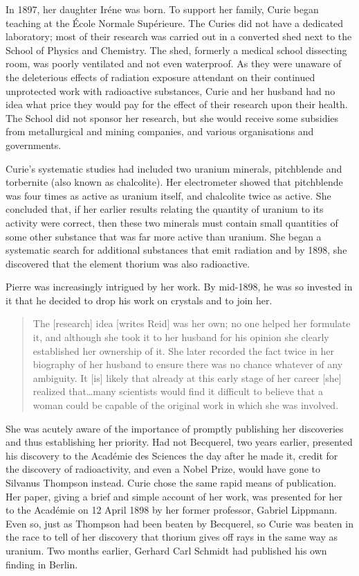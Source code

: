 \documentclass[12pt,a4paper]{article}
\begin{document}
In 1897, her daughter Ir\'ene was born. To support her family, Curie began teaching at the \'Ecole Normale Sup\'erieure. The Curies did not have a dedicated laboratory; most of their research was carried out in a converted shed next to the School of Physics and Chemistry. The shed, formerly a medical school dissecting room, was poorly ventilated and not even waterproof. As they were unaware of the deleterious effects of radiation exposure attendant on their continued unprotected work with radioactive substances, Curie and her husband had no idea what price they would pay for the effect of their research upon their health. The School did not sponsor her research, but she would receive some subsidies from metallurgical and mining companies, and various organisations and governments.

Curie's systematic studies had included two uranium minerals, pitchblende and torbernite (also known as chalcolite). Her electrometer showed that pitchblende was four times as active as uranium itself, and chalcolite twice as active. She concluded that, if her earlier results relating the quantity of uranium to its activity were correct, then these two minerals must contain small quantities of some other substance that was far more active than uranium. She began a systematic search for additional substances that emit radiation and by 1898, she discovered that the element thorium was also radioactive.

Pierre was increasingly intrigued by her work. By mid-1898, he was so invested in it that he decided to drop his work on crystals and to join her.

\begin{quote}The [research] idea [writes Reid] was her own; no one helped her formulate it, and although she took it to her husband for his opinion she clearly established her ownership of it. She later recorded the fact twice in her biography of her husband to ensure there was no chance whatever of any ambiguity. It [is] likely that already at this early stage of her career [she] realized that\ldots many scientists would find it difficult to believe that a woman could be capable of the original work in which she was involved.\cite{Reid:1974:MSC}
\end{quote}

She was acutely aware of the importance of promptly publishing her discoveries and thus establishing her priority. Had not Becquerel, two years earlier, presented his discovery to the Acad\'emie des Sciences the day after he made it, credit for the discovery of radioactivity, and even a Nobel Prize, would have gone to Silvanus Thompson instead. Curie chose the same rapid means of publication. Her paper, giving a brief and simple account of her work, was presented for her to the Acad\'emie on 12 April 1898 by her former professor, Gabriel Lippmann. Even so, just as Thompson had been beaten by Becquerel, so Curie was beaten in the race to tell of her discovery that thorium gives off rays in the same way as uranium. Two months earlier, Gerhard Carl Schmidt had published his own finding in Berlin.\cite{Reid:1974:MSC65}
\end{document}
